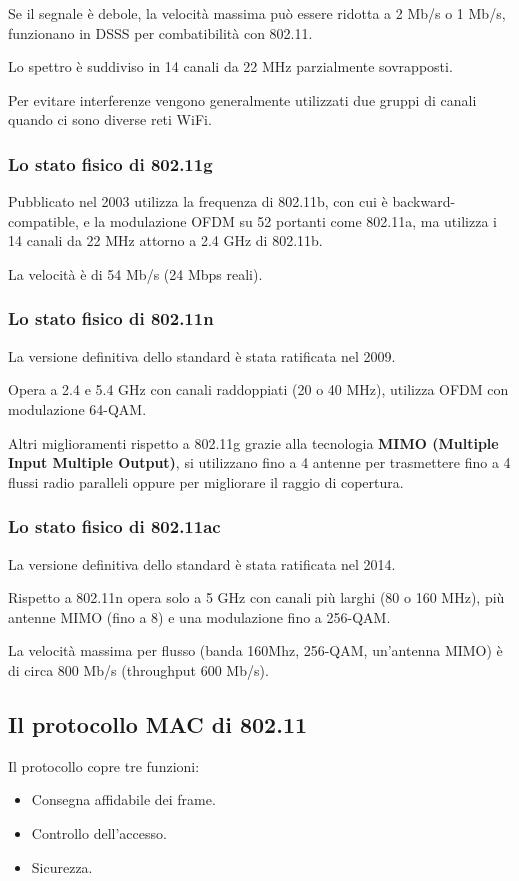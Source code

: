             Se il segnale è debole, la velocità massima può essere ridotta a 2 Mb/s o 1 Mb/s, funzionano in DSSS per combatibilità con 802.11.

            Lo spettro è suddiviso in 14 canali da 22 MHz parzialmente sovrapposti.

            Per evitare interferenze vengono generalmente utilizzati due gruppi di canali quando ci sono diverse reti WiFi.

        \subsubsection{Lo stato fisico di 802.11g}
            Pubblicato nel 2003 utilizza la frequenza di 802.11b, con cui è backward-compa\-tible, e la modulazione OFDM su 52 portanti come 802.11a, ma utilizza i 14 canali da 22 MHz attorno a 2.4 GHz di 802.11b.

            La velocità è di 54 Mb/s (24 Mbps reali).
        
        \subsubsection{Lo stato fisico di 802.11n}
            La versione definitiva dello standard è stata ratificata nel 2009.
        
            Opera a 2.4 e 5.4 GHz con canali raddoppiati (20 o 40 MHz), utilizza OFDM con modulazione 64-QAM.
        
            Altri miglioramenti rispetto a 802.11g grazie alla tecnologia \textbf{MIMO (Multiple Input Multiple Output)}, si utilizzano fino a 4 antenne per trasmettere fino a 4 flussi radio paralleli oppure per migliorare il raggio di copertura.

        \subsubsection{Lo stato fisico di 802.11ac}
            La versione definitiva dello standard è stata ratificata nel 2014.
        
            Rispetto a 802.11n opera solo a 5 GHz con canali più larghi (80 o 160 MHz), più antenne MIMO (fino a 8) e una modulazione fino a 256-QAM.

            La velocità massima per flusso (banda 160Mhz, 256-QAM, un'antenna MIMO) è di circa 800 Mb/s (throughput 600 Mb/s).

    \subsection{Il protocollo MAC di 802.11}
        Il protocollo copre tre funzioni:
        \begin{itemize}
            \item Consegna affidabile dei frame.
            \item Controllo dell'accesso.
            \item Sicurezza.
        \end{itemize}
        

